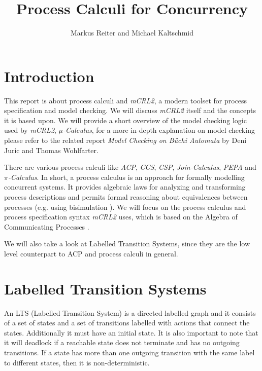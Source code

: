 \documentclass{clseminar}
\title{Process Calculi for Concurrency}
\author{Markus Reiter and Michael Kaltschmid}
\begin{document}
  \maketitle
  \newpage
  \tableofcontents

  \section{Introduction}
  This report is about process calculi and \textit{mCRL2}, a modern toolset for process specification and model checking. We will discuss \textit{mCRL2} itself and the concepts it is based upon. We will provide a short overview of the model checking logic used by \textit{mCRL2}, \textit{$\mu$-Calculus}, for a more in-depth explanation on model checking please refer to the related report \textit{Model Checking on Büchi Automata} by Deni Juric and Thomas Wohlfarter.

  There are various process calculi like \textit{ACP}, \textit{CCS}, \textit{CSP}, \textit{Join-Calculus}, \textit{PEPA} and \textit{$\pi$-Calculus}. In short, a process calculus is an approach for formally modelling concurrent systems. It provides algebraic laws for analyzing and transforming process descriptions and permits formal reasoning about equivalences between processes (e.g. using bisimulation \cite{process_calculus_wiki}). We will focus on the process calculus and process specification syntax \textit{mCRL2} uses, which is based on the Algebra of Communicating Processes \cite{acp_wiki}.

  We will also take a look at Labelled Transition Systems, since they are the low level counterpart to ACP and process calculi in general.

  \section{Labelled Transition Systems}

  An LTS (Labelled Transition System) is a directed labelled graph and it consists of a set of states and a set of transitions labelled with actions that connect the states. Additionally it must have an initial state. It is also important to note that it will deadlock if a reachable state does not terminate and has no outgoing
  transitions. If a state has more than one outgoing transition with the same label to different states, then it is non-deterministic.
\end{document}
